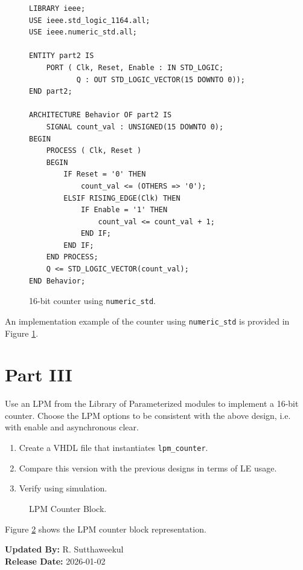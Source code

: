 \documentclass{article}
\begin{document}
\begin{figure}[H]
    \centering
    \begin{verbatim}
LIBRARY ieee;
USE ieee.std_logic_1164.all;
USE ieee.numeric_std.all;

ENTITY part2 IS
    PORT ( Clk, Reset, Enable : IN STD_LOGIC;
           Q : OUT STD_LOGIC_VECTOR(15 DOWNTO 0));
END part2;

ARCHITECTURE Behavior OF part2 IS
    SIGNAL count_val : UNSIGNED(15 DOWNTO 0);
BEGIN
    PROCESS ( Clk, Reset )
    BEGIN
        IF Reset = '0' THEN
            count_val <= (OTHERS => '0');
        ELSIF RISING_EDGE(Clk) THEN
            IF Enable = '1' THEN
                count_val <= count_val + 1;
            END IF;
        END IF;
    END PROCESS;
    Q <= STD_LOGIC_VECTOR(count_val);
END Behavior;
    \end{verbatim}
    \caption{16-bit counter using \texttt{numeric\_std}.}
    \label{fig:part2_code}
\end{figure}

An implementation example of the counter using \texttt{numeric\_std} is provided in Figure \ref{fig:part2_code}.

\section*{Part III}

Use an LPM from the Library of Parameterized modules to implement a 16-bit counter. Choose the LPM options to be consistent with the above design, i.e. with enable and asynchronous clear.

\begin{enumerate}
    \item Create a VHDL file that instantiates \texttt{lpm\_counter}.
    \item Compare this version with the previous designs in terms of LE usage.
    \item Verify using simulation.
\end{enumerate}

\begin{figure}[H]
    \centering
    
    \caption{LPM Counter Block.}
    \label{fig:lpm_counter}
\end{figure}
Figure \ref{fig:lpm_counter} shows the LPM counter block representation.



\vspace{1cm}
\noindent \textbf{Updated By:} R. Sutthaweekul \\
\textbf{Release Date:} 2026-01-02
\end{document}
